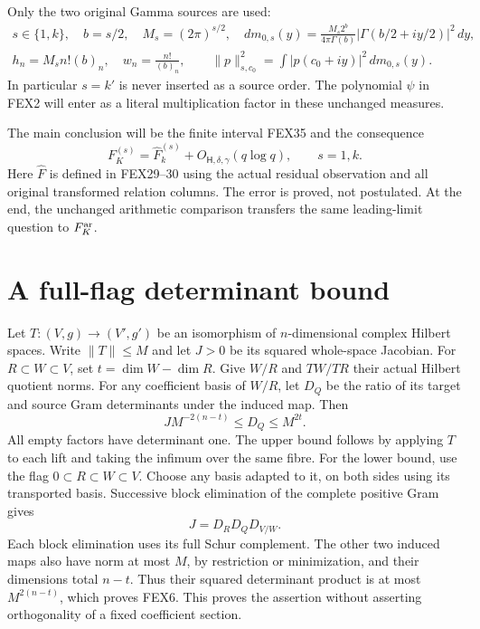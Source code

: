 \documentclass[11pt,a4paper]{article}
\begin{document}
Only the two original Gamma sources are used:
\[
\begin{gathered}
 s\in\{1,k\},\quad b=s/2,\quad M_s=(2\pi)^{s/2},\quad
 dm_{0,s}(y)=\frac{M_s2^b}{4\pi\Gamma(b)}
                 |\Gamma(b/2+iy/2)|^2\,dy,\\
 h_n=M_s n!(b)_n,\quad w_n=\frac{n!}{(b)_n},\qquad
 \|p\|_{s,c_0}^2=\int |p(c_0+iy)|^2\,dm_{0,s}(y).
\end{gathered}\tag{FEX4}
\]
In particular $s=k'$ is never inserted as a source order. The polynomial
$\psi$ in FEX2 will enter as a literal multiplication factor in these
unchanged measures.

The main conclusion will be the finite interval FEX35 and the consequence
\[
 \boxed{\quad F_K^{(s)}=\widehat F_k^{(s)}
          +O_{\mathsf H,\delta,\gamma}(q\log q),\qquad s=1,k.\quad}
 \tag{FEX5}
\]
Here $\widehat F$ is defined in FEX29--30 using the actual residual
observation and all original transformed relation columns. The error
is proved, not postulated. At the end, the unchanged arithmetic
comparison transfers the same leading-limit question to $F_K^{\rm ar}$.

\section{A full-flag determinant bound}
\label{sec:FEX-flag}
Let $T:(V,g)\to(V',g')$ be an isomorphism of $n$-dimensional complex
Hilbert spaces. Write $\|T\|\le M$ and let $J>0$ be its squared whole-space
Jacobian. For $R\subset W\subset V$, set $t=\dim W-\dim R$. Give $W/R$
and $TW/TR$ their actual Hilbert quotient norms. For any coefficient
basis of $W/R$, let $D_Q$ be the ratio of its target and source Gram
determinants under the induced map. Then
\[
 \boxed{\qquad J M^{-2(n-t)}\le D_Q\le M^{2t}.\qquad}
 \tag{FEX6}
\]
All empty factors have determinant one. The upper bound follows by
applying $T$ to each lift and taking the infimum over the same fibre.
For the lower bound, use the flag $0\subset R\subset W\subset V$.
Choose any basis adapted to it, on both sides using its transported
basis. Successive block elimination of the complete positive Gram gives
\[
 J=D_R D_Q D_{V/W}.
 \tag{FEX7}
\]
Each block elimination uses its full Schur complement. The other two
induced maps also have norm at most $M$, by restriction or minimization,
and their dimensions total $n-t$. Thus their squared determinant product
is at most $M^{2(n-t)}$, which proves FEX6. This proves the assertion
without asserting orthogonality of a fixed coefficient section.
\end{document}
